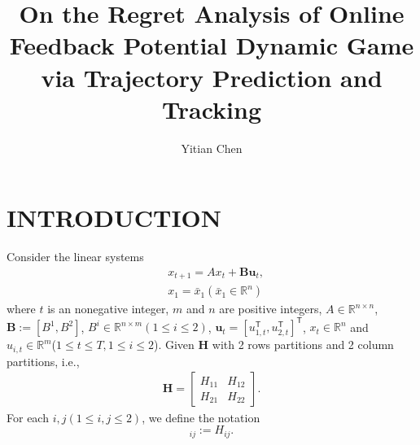 \documentclass{article}
\title{On the Regret Analysis of Online Feedback Potential Dynamic Game via Trajectory Prediction and Tracking}
\author{Yitian Chen}
\newcommand{\transpose}{\mathsf{T}}
\begin{document}
\maketitle

\section{INTRODUCTION}
Consider the linear systems
\begin{align}
    &x_{t+1} = Ax_{t} + \mathbf{B}\mathbf{u}_{t}\label{eq:linsys},\\
    &x_{1} =\bar{x}_{1}(\bar{x}_1 \in \mathbb{R}^{n})\label{eq:initialx}
\end{align}
where $t$ is an nonegative integer, $m$ and $n$ are positive integers, $A \in \mathbb{R}^{n\times n}$, $\mathbf{B} := [B^{1}, B^{2}]$, $B^{i} \in \mathbb{R}^{n\times m}(1\leq i \leq 2)$, $\mathbf{u}_{t} = [u_{1,t}^{\transpose},u_{2,t}^{\transpose}]^{\transpose}$, $x_{t}\in\mathbb{R}^n$ and $u_{i,t} \in \mathbb{R}^{m}$($1\leq t \leq T,1\leq i \leq 2$). 
Given $\mathbf{H}$ with 2 rows partitions and 2 column partitions, i.e.,
\begin{align*}
    \mathbf{H} = 
    \begin{bmatrix}
        H_{11} & H_{12}\\
        H_{21} & H_{22}
    \end{bmatrix}.
\end{align*}
For each $i,j(1\leq i,j\leq 2)$, we define the notation
\begin{equation}
    [\mathbf{H}]_{ij} := H_{ij}.
\end{equation}
\end{document}
